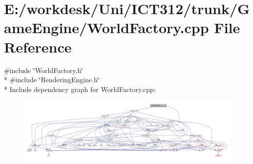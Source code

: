 \section{E\+:/workdesk/\+Uni/\+I\+C\+T312/trunk/\+Game\+Engine/\+World\+Factory.cpp File Reference}
\label{_world_factory_8cpp}
{\ttfamily \#include \char`\"{}World\+Factory.\+h\char`\"{}}\\*
{\ttfamily \#include \char`\"{}Rendering\+Engine.\+h\char`\"{}}\\*
Include dependency graph for World\+Factory.\+cpp\+:
\nopagebreak
\begin{figure}[H]
\begin{center}
\leavevmode
\includegraphics[width=350pt]{dc/dc0/_world_factory_8cpp__incl}
\end{center}
\end{figure}

